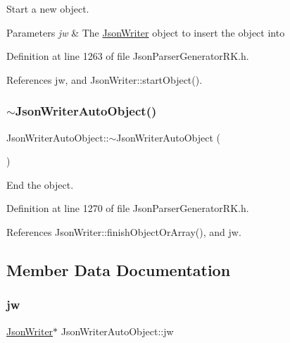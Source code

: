 Start a new object. 


\begin{DoxyParams}{Parameters}
{\em jw} & The \hyperlink{class_json_writer}{Json\+Writer} object to insert the object into \\
\hline
\end{DoxyParams}


Definition at line 1263 of file Json\+Parser\+Generator\+R\+K.\+h.



References jw, and Json\+Writer\+::start\+Object().

\mbox{\label{class_json_writer_auto_object_adb79acd280cd69ae5d0d6afea1c187bc}} 
\subsubsection{\texorpdfstring{$\sim$\+Json\+Writer\+Auto\+Object()}{~JsonWriterAutoObject()}}
{\footnotesize\ttfamily Json\+Writer\+Auto\+Object\+::$\sim$\+Json\+Writer\+Auto\+Object (\begin{DoxyParamCaption}{ }\end{DoxyParamCaption})\hspace{0.3cm}{\ttfamily [inline]}}



End the object. 



Definition at line 1270 of file Json\+Parser\+Generator\+R\+K.\+h.



References Json\+Writer\+::finish\+Object\+Or\+Array(), and jw.



\subsection{Member Data Documentation}
\mbox{\label{class_json_writer_auto_object_a4ffea7af57b2ceb87edd5e7ee08aeefb}} 
\subsubsection{\texorpdfstring{jw}{jw}}
{\footnotesize\ttfamily \hyperlink{class_json_writer}{Json\+Writer}$\ast$ Json\+Writer\+Auto\+Object\+::jw\hspace{0.3cm}{\ttfamily [protected]}}



